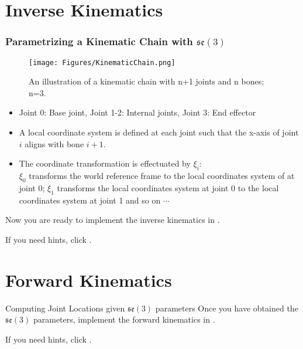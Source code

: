 \documentclass{beamer}
\begin{document}
\section{Inverse Kinematics}
\begin{frame}
\frametitle{Parametrizing a Kinematic Chain with $\mathfrak{se}(3)$}
\begin{figure}[H]
\centering
\texttt{[image: Figures/KinematicChain.png]}
\caption
{An illustration of a kinematic chain with n+1 joints and n bones; n=3.}
\label{fig:kinematicchain}
\end{figure}
\begin{itemize}
\justifying
\item Joint 0: Base joint, Joint 1-2: Internal joints, Joint 3: End effector
\item A local coordinate system is defined at each joint such that the x-axis of joint $i$ aligns with bone $i+1$.
\item The coordinate transformation is effectuated by $\xi_i$:\\
$\xi_0$ transforms the world reference frame to the local coordinates system of at joint 0; $\xi_1$ transforms the local coordinates system at joint 0 to the local coordinates system at joint 1 and so on $\cdots$
\end{itemize}
\end{frame}
\begin{frame}
Now you are ready to implement the inverse kinematics in \href{run:./inverse.m}{}.

If you need hints, click
\hyperref{Supplementary.pdf}{page}{1}{}.
\end{frame}

\section{Forward Kinematics}
\begin{frame}{Computing Joint Locations given $\mathfrak{se}(3)$ parameters}
Once you have obtained the $\mathfrak{se}(3)$ parameters, implement the forward kinematics in \href{run:./forward.m}{}.

If you need hints, click
\hyperref{Supplementary.pdf}{page}{2}{}.
\end{frame}
\end{document}
